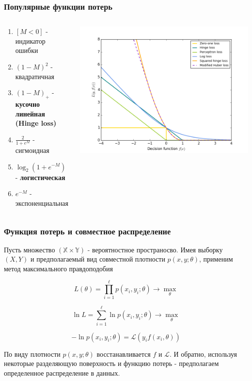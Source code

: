 \documentclass{beamer}
\begin{document}
	\begin{frame}
		\frametitle{Популярные функции потерь}
		
		\begin{columns}
			\begin{column}{0.4\textwidth}
				\begin{enumerate}
					\item $[M < 0]$ - индикатор ошибки
					\item $(1 - M)^2$ - квадратичная
					\item $(1 - M)_{+}$ - \textbf{кусочно линейная (Hinge loss)}
					\item $\frac{2}{1 + e^M}$ - сигмоидная
					\item $\log_2(1 + e^{-M})$ - \textbf{логистическая}
					\item $e^{-M}$ - экспоненциальная
				\end{enumerate}
			\end{column}
			\begin{column}{0.6\textwidth}
				\centering
				\includegraphics[width=1.15\textwidth]{img/loss_func.png}	
			\end{column}
		\end{columns}
	\end{frame}
	
	\begin{frame}
		\frametitle{Функция потерь и совместное распределение}
		Пусть множество $(\mathbb{X} \times \mathbb{Y})$ - вероятностное пространосво. Имея выборку $(X, Y)$ и предполагаемый вид совместной плотности $p(x, y; \theta)$, применим метод максимального правдоподобия
		
		\[
		L(\theta) = \prod_{i=1}^{\ell} p(x_i, y_i; \theta) \rightarrow \max_{\theta}
		\]
		
		\[
		\ln L = \sum_{i=1}^{\ell} \ln p(x_i, y_i; \theta) \rightarrow \max_{\theta}
		\]
		
		\[
		- \ln p(x_i, y_i; \theta) = \mathcal{L}(y_i f(x_i, \theta))
		\]
		
		По виду плотности $p(x, y; \theta)$ восстанавливается $f$ и $\mathcal{L}$. И обратно, используя некоторые разделяющую поверхность и функцию потерь - предполагаем определенное распределение в данных.
	\end{frame}
	
\end{document}
